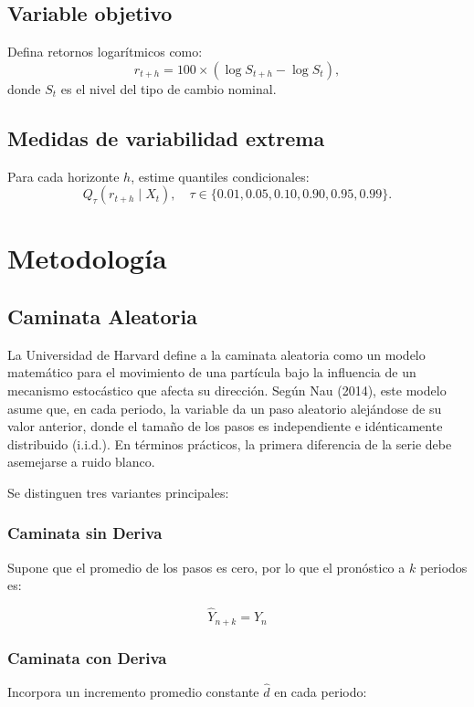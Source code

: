 ﻿\documentclass[11pt,a4paper]{article}
\begin{document}
\subsection{Variable objetivo}
Defina retornos logarítmicos como:
\begin{equation}
    r_{t+h} = 100\times\left(\log S_{t+h} - \log S_t\right),
\end{equation}
donde $S_t$ es el nivel del tipo de cambio nominal.

\subsection{Medidas de variabilidad extrema}
Para cada horizonte $h$, estime quantiles condicionales:
\begin{equation}
    Q_{\tau}(r_{t+h}\mid X_t),\quad \tau \in \{0.01,0.05,0.10,0.90,0.95,0.99\}.
\end{equation}

\section{Metodología}

\subsection{Caminata Aleatoria}

La Universidad de Harvard define a la caminata aleatoria como un modelo matemático para el movimiento de una partícula bajo la influencia de un mecanismo estocástico que afecta su dirección. Según Nau (2014), este modelo asume que, en cada periodo, la variable da un paso aleatorio alejándose de su valor anterior, donde el tamaño de los pasos es independiente e idénticamente distribuido (i.i.d.). En términos prácticos, la primera diferencia de la serie debe asemejarse a ruido blanco.

Se distinguen tres variantes principales:

\subsubsection{Caminata sin Deriva}
Supone que el promedio de los pasos es cero, por lo que el pronóstico a $k$ periodos es:

\begin{equation}
\hat{Y}_{n+k} = Y_n
\end{equation}

\subsubsection{Caminata con Deriva}
Incorpora un incremento promedio constante $\hat{d}$ en cada periodo:
\end{document}
